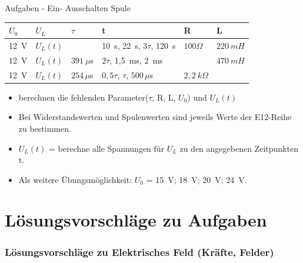 \begin{frame}{Aufgaben - Ein- Ausschalten Spule}
\begin{tabular}{|l|l|l|l|l|l|}
  \hline
 $U_0$  & $U_L$    & $\tau$    & t &            R &  L\\ \hline
 12\, V & $U_L(t)$ &           & 10\, s, 22\, s, $3\tau$, 120\, s  & $100 \Omega$ & $220\ mH$\\ \hline
 12\, V & $U_L(t)$ & $391\ \mu $s & $2\tau$, 1,5\, ms, 2\, ms  &  & $470\ mH$\\ \hline
 12\, V & $U_L(t)$ & $254\, \mu $s & $0,5\tau$, $\tau$, $500\, \mu $s & $2,2\ k\Omega$ & \\ \hline
\end{tabular}
\begin{itemize}
  \item berechnen die fehlenden Parameter($\tau$, R, L, $U_0$) und $U_L(t)$
 \item Bei Widerstandswerten und Spulenwerten sind jeweils Werte der E12-Reihe zu bestimmen.
 \item $U_L(t)$ = berechne alle Spannungen für $U_L$ zu den angegebenen Zeitpunkten t.
 \item Als weitere Übungsmöglichkeit: $U_0$ = 15\, V; 18\, V; 20\, V; 24\, V.
\end{itemize}
\end{frame}

\part{Lösungsvorschläge zu Aufgaben}
\section{Lösungsvorschläge zu Elektrisches Feld (Kräfte, Felder)}
\begin{frame}
  \hypertarget{LoesungsVorschlaege}{}


  \hyperlink{Uebersicht}{}
\end{frame}



